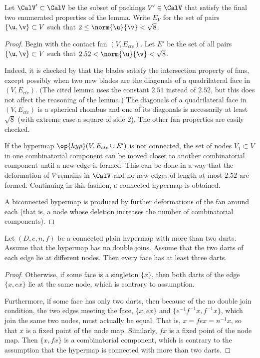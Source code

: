 \begin{definition}[$\CalV'$,~$E_V$]
%
%
Let $\CalV'\subset\CalV$ be the subset of packings $V'\in\CalV$ that
satisfy the final two enumerated properties of the lemma.  Write
$E_V$ for the set of pairs $\{\u,\v\}\subset V$
  such that $2\le\norm{\u}{\v} <\sqrt8$.
\end{definition}

\begin{proof}
  Begin with the contact fan $(V,E_{ctc})$.  Let $E'$ be the set
  of all pairs $\{\u,\v\}\subset V$ such that
  $2.52<\norm{\u}{\v}<\sqrt8$.

   Indeed, it is checked by
  \cite[Lemma~4.30]{Hales:2006:DCG} that the blades satisfy the
  intersection property of fans, except possibly when two new blades
  are the diagonals of a quadrilateral face in $(V,E_{ctc})$.  (The
  cited lemma uses the constant $2.51$ instead of $2.52$, but this
  does not affect the reasoning of the lemma.)  The diagonals of a quadrilateral face
  in $(V,E_{ctc})$ is a spherical rhombus and one of its diagonals is
  necessarily at least $\sqrt8$ (with extreme case a square of side
  $2$).  The other fan properties are easily checked.

  If the hypermap $\op{hyp}(V,E_{ctc}\cup E')$ is not connected,
  the set of nodes $V_1\subset V$ in one combinatorial component can
  be moved closer to another combinatorial component until a new edge
  is formed.  This can be done in a way that the deformation of $V$
  remains in $\CalV$ and no new edges of length at most $2.52$ are formed.
  Continuing in this fashion, a connected hypermap is obtained.

A biconnected hypermap is produced by  further
 deformations of the fan around each   (that is, a node 
whose deletion increases the number of combinatorial components).
\end{proof}


\begin{lemma}\label{lemma:dj}
Let $(D,e,n,f)$ be a connected plain hypermap with more than
two darts.  Assume that the hypermap has no  double joins. Assume that the
two darts of each edge lie at different nodes.
Then
every face has at least three darts.
\end{lemma}

\begin{proof}
Otherwise, if some face is a singleton $\{x\}$, then both darts
of the edge $\{x,e x\}$ lie at the same node, which is contrary to
assumption.

  Furthermore, if some face has only two darts, then because of the no
  double join condition, the two edges meeting the face, $\{x, e x\}$
  and $\{ e^{-1} f^{-1} x, f^{-1} x\}$, which join the same two nodes,
 must actually be equal.  That
  is, $ x = f e x = n^{-1} x$, so that $x$ is a fixed point of the node
  map.  Similarly, $f x$ is a fixed point of the node map.  Then $\{x,
  f x\}$ is a combinatorial component, which is contrary to the
  assumption that the hypermap is connected with more than two darts.
\end{proof}


